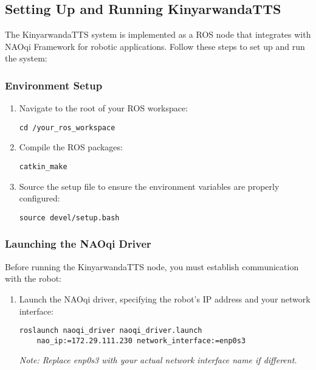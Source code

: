 \documentclass{CSSRforAfrica}
\begin{document}
\subsection{Setting Up and Running KinyarwandaTTS}

The KinyarwandaTTS system is implemented as a ROS node that integrates with NAOqi Framework for robotic applications. Follow these steps to set up and run the system:

\subsubsection{Environment Setup}
\begin{enumerate}
    \item Navigate to the root of your ROS workspace:
    \begin{lstlisting}[style=commandstyle]
    cd /your_ros_workspace
    \end{lstlisting}
    \item Compile the ROS packages:
    \begin{lstlisting}[style=commandstyle]
    catkin_make
    \end{lstlisting}
    \item Source the setup file to ensure the environment variables are properly configured:
    \begin{lstlisting}[style=commandstyle]
    source devel/setup.bash
    \end{lstlisting}
\end{enumerate}

\subsubsection{Launching the NAOqi Driver}
Before running the KinyarwandaTTS node, you must establish communication with the robot:

\begin{enumerate}
    \item Launch the NAOqi driver, specifying the robot's IP address and your network interface:
    \begin{lstlisting}[style=commandstyle]
    roslaunch naoqi_driver naoqi_driver.launch 
    nao_ip:=172.29.111.230 network_interface:=enp0s3
    \end{lstlisting}

    \textit{Note: Replace enp0s3 with your actual network interface name if different.}
\end{enumerate}
\end{document}
